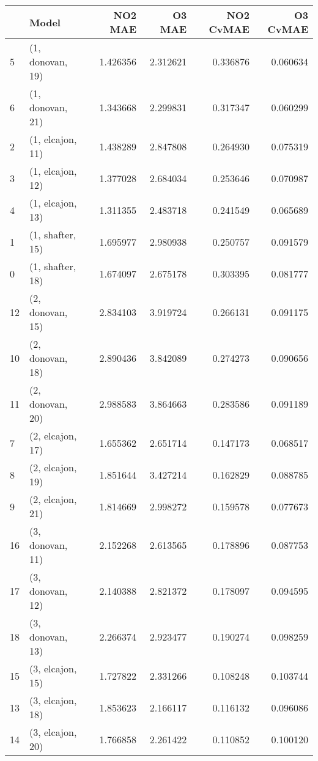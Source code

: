\begin{tabular}{llrrrr}
\toprule
{} &             Model &   NO2 MAE &    O3 MAE &  NO2 CvMAE &  O3 CvMAE \\
\midrule
5  &  (1, donovan, 19) &  1.426356 &  2.312621 &   0.336876 &  0.060634 \\
6  &  (1, donovan, 21) &  1.343668 &  2.299831 &   0.317347 &  0.060299 \\
2  &  (1, elcajon, 11) &  1.438289 &  2.847808 &   0.264930 &  0.075319 \\
3  &  (1, elcajon, 12) &  1.377028 &  2.684034 &   0.253646 &  0.070987 \\
4  &  (1, elcajon, 13) &  1.311355 &  2.483718 &   0.241549 &  0.065689 \\
1  &  (1, shafter, 15) &  1.695977 &  2.980938 &   0.250757 &  0.091579 \\
0  &  (1, shafter, 18) &  1.674097 &  2.675178 &   0.303395 &  0.081777 \\
12 &  (2, donovan, 15) &  2.834103 &  3.919724 &   0.266131 &  0.091175 \\
10 &  (2, donovan, 18) &  2.890436 &  3.842089 &   0.274273 &  0.090656 \\
11 &  (2, donovan, 20) &  2.988583 &  3.864663 &   0.283586 &  0.091189 \\
7  &  (2, elcajon, 17) &  1.655362 &  2.651714 &   0.147173 &  0.068517 \\
8  &  (2, elcajon, 19) &  1.851644 &  3.427214 &   0.162829 &  0.088785 \\
9  &  (2, elcajon, 21) &  1.814669 &  2.998272 &   0.159578 &  0.077673 \\
16 &  (3, donovan, 11) &  2.152268 &  2.613565 &   0.178896 &  0.087753 \\
17 &  (3, donovan, 12) &  2.140388 &  2.821372 &   0.178097 &  0.094595 \\
18 &  (3, donovan, 13) &  2.266374 &  2.923477 &   0.190274 &  0.098259 \\
15 &  (3, elcajon, 15) &  1.727822 &  2.331266 &   0.108248 &  0.103744 \\
13 &  (3, elcajon, 18) &  1.853623 &  2.166117 &   0.116132 &  0.096086 \\
14 &  (3, elcajon, 20) &  1.766858 &  2.261422 &   0.110852 &  0.100120 \\
\bottomrule
\end{tabular}
